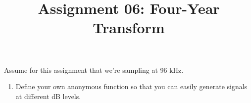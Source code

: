 \documentclass{article}
\title{Assignment 06: Four-Year Transform}
\begin{document}
\renderTitle

Assume for this assignment that we're sampling at 96 kHz.

\begin{enumerate}[leftmargin=*]
	\item
		Define your own anonymous  function
		so that you can easily generate signals at different dB
		levels.
\end{enumerate}
\end{document}
